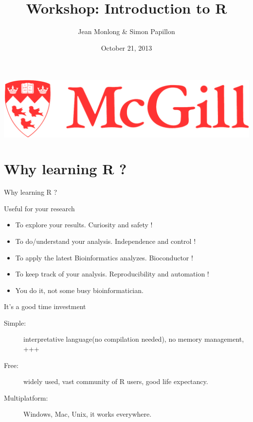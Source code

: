 \documentclass[10pt]{beamer}
\title{Workshop: Introduction to R}
\author{Jean Monlong \& Simon Papillon}
\institute{Human Genetics department}
\date{October 21, 2013}
\begin{document}
\begin{frame}
  \titlepage
  \centering
  \includegraphics[page=1,height=.1\textheight]{imgs/McGill-Logo1.png}

\end{frame}

\section{Why learning R ?}

\begin{frame}{Why learning R ?}
\begin{block}{Useful for your research}
  \begin{itemize}
  \item To explore your results. Curiosity and safety !
  \item To do/understand your analysis. Independence and control !
  \item To apply the latest Bioinformatics analyzes. Bioconductor !
  \item To keep track of your analysis. Reproducibility and automation !
    \bigskip
  \item You do it, not some busy bioinformatician. 
  \end{itemize}
\end{block}
\begin{block}{It's a good time investment}
  \begin{description}
  \item[Simple:] interpretative language(no compilation needed), no memory management, +++
  \item[Free:] widely used, vast community of R users, good life expectancy.
  \item[Multiplatform:] Windows, Mac, Unix, it works everywhere.
  \end{description}
\end{block}
\end{frame}
\end{document}
